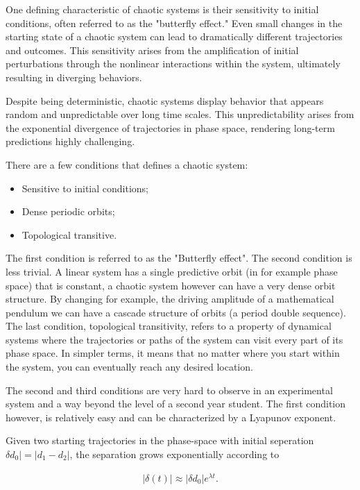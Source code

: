 \documentclass{article}
\begin{document}
One defining characteristic of chaotic systems is their sensitivity to initial conditions, often referred to as the "butterfly effect." Even small changes in the starting state of a chaotic system can lead to dramatically different trajectories and outcomes. This sensitivity arises from the amplification of initial perturbations through the nonlinear interactions within the system, ultimately resulting in diverging behaviors.

Despite being deterministic, chaotic systems display behavior that appears random and unpredictable over long time scales. This unpredictability arises from the exponential divergence of trajectories in phase space, rendering long-term predictions highly challenging.

There are a few conditions that defines a chaotic system:
\begin{itemize}
    \item Sensitive to initial conditions;
    \item Dense periodic orbits;
    \item Topological transitive.
\end{itemize}
The first condition is referred to as the "Butterfly effect". The second condition is less trivial. A linear system has a single predictive orbit (in for example phase space) that is constant, a chaotic system however can have a very dense orbit structure. By changing for example, the driving amplitude of a mathematical pendulum we can have a cascade structure of orbits (a period double sequence). The last condition, topological transitivity, refers to a property of dynamical systems where the trajectories or paths of the system can visit every part of its phase space. In simpler terms, it means that no matter where you start within the system, you can eventually reach any desired location.

The second and third conditions are very hard to observe in an experimental system and a way beyond the level of a second year student. The first condition however, is relatively easy and can be characterized by a Lyapunov exponent.

Given two starting trajectories in the phase-space with initial seperation $\delta d_0| = |d_1-d_2|$, the separation grows exponentially according to

\begin{align}
    |\delta(t)|\approx |\delta d_0|e^{\lambda t}.
    \label{Eq. Lyapunov}
\end{align}
\end{document}
